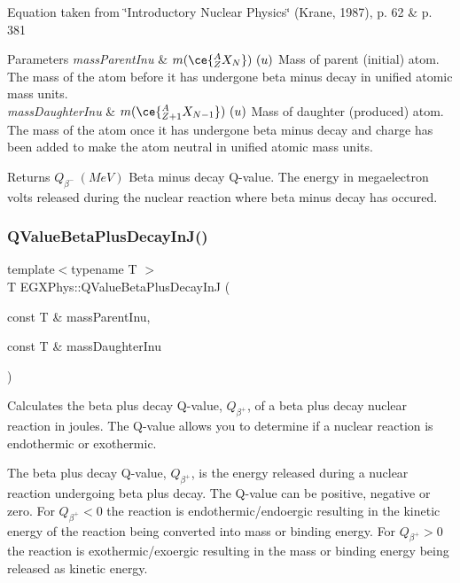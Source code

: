 Equation taken from \char`\"{}\+Introductory Nuclear Physics\char`\"{} (Krane, 1987), p. 62 \& p. 381


\begin{DoxyParams}{Parameters}
{\em mass\+Parent\+Inu} & $m(\ce{ ^{A}_{Z}X_{N} })\ (u)$ Mass of parent (initial) atom. The mass of the atom before it has undergone beta minus decay in unified atomic mass units. \\
\hline
{\em mass\+Daughter\+Inu} & $m(\ce{ ^{A}_{Z{+1}}X_{N-1} })\ (u)$ Mass of daughter (produced) atom. The mass of the atom once it has undergone beta minus decay and charge has been added to make the atom neutral in unified atomic mass units. \\
\hline
\end{DoxyParams}
\begin{DoxyReturn}{Returns}
$Q_{\beta^-}\ (MeV)$ Beta minus decay Q-\/value. The energy in megaelectron volts released during the nuclear reaction where beta minus decay has occured. 
\end{DoxyReturn}
\mbox{\label{group___e_g_x_phys-_q_value_ga066fe9a9816a204c801c557a85bc60df}} 
\subsubsection{\texorpdfstring{Q\+Value\+Beta\+Plus\+Decay\+In\+J()}{QValueBetaPlusDecayInJ()}}
{\footnotesize\ttfamily template$<$typename T $>$ \\
T E\+G\+X\+Phys\+::\+Q\+Value\+Beta\+Plus\+Decay\+InJ (\begin{DoxyParamCaption}\item[{const T \&}]{mass\+Parent\+Inu,  }\item[{const T \&}]{mass\+Daughter\+Inu }\end{DoxyParamCaption})}



Calculates the beta plus decay Q-\/value, $Q_{\beta^+}$, of a beta plus decay nuclear reaction in joules. The Q-\/value allows you to determine if a nuclear reaction is endothermic or exothermic. 

The beta plus decay Q-\/value, $Q_{\beta^+}$, is the energy released during a nuclear reaction undergoing beta plus decay. The Q-\/value can be positive, negative or zero. For $Q_{\beta^+} < 0$ the reaction is endothermic/endoergic resulting in the kinetic energy of the reaction being converted into mass or binding energy. For $Q_{\beta^+} > 0$ the reaction is exothermic/exoergic resulting in the mass or binding energy being released as kinetic energy.


